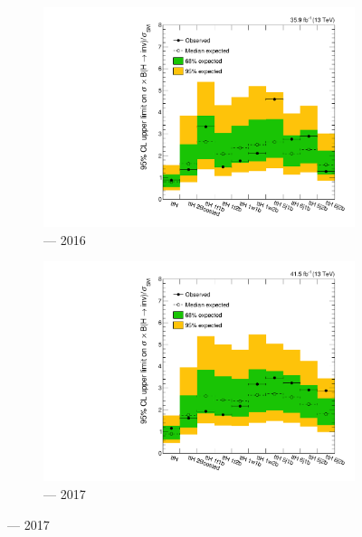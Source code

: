 \begin{figure}[htbp]
    \centering
    \begin{subfigure}[b]{0.45\textwidth}
        \includegraphics[width=\textwidth]{chapters/higgstoinv/figures/limits/ttH/limit_2016_ttH.pdf}
        \caption{\ttH --- 2016}
    \end{subfigure}
    \hfill
    \begin{subfigure}[b]{0.45\textwidth}
        \includegraphics[width=\textwidth]{chapters/higgstoinv/figures/limits/ttH/limit_2017_ttH.pdf}
        \caption{\ttH --- 2017}
    \end{subfigure}


\end{figure}
